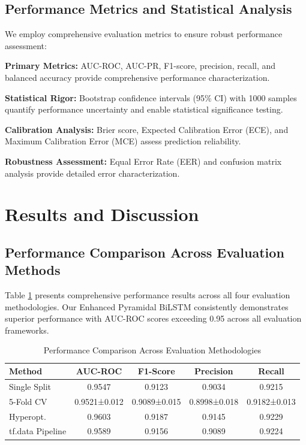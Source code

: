 \documentclass[conference]{IEEEtran}
\begin{document}
\subsection{Performance Metrics and Statistical Analysis}

We employ comprehensive evaluation metrics to ensure robust performance assessment:

\textbf{Primary Metrics:} AUC-ROC, AUC-PR, F1-score, precision, recall, and balanced accuracy provide comprehensive performance characterization.

\textbf{Statistical Rigor:} Bootstrap confidence intervals (95\% CI) with 1000 samples quantify performance uncertainty and enable statistical significance testing.

\textbf{Calibration Analysis:} Brier score, Expected Calibration Error (ECE), and Maximum Calibration Error (MCE) assess prediction reliability.

\textbf{Robustness Assessment:} Equal Error Rate (EER) and confusion matrix analysis provide detailed error characterization.

\section{Results and Discussion}

\subsection{Performance Comparison Across Evaluation Methods}

Table \ref{tab:performance} presents comprehensive performance results across all four evaluation methodologies. Our Enhanced Pyramidal BiLSTM consistently demonstrates superior performance with AUC-ROC scores exceeding 0.95 across all evaluation frameworks.

\begin{table}[h]
\centering
\caption{Performance Comparison Across Evaluation Methodologies}
\label{tab:performance}
\begin{tabular}{l|c|c|c|c}
\hline
\textbf{Method} & \textbf{AUC-ROC} & \textbf{F1-Score} & \textbf{Precision} & \textbf{Recall} \\
\hline
Single Split & 0.9547 & 0.9123 & 0.9034 & 0.9215 \\
5-Fold CV & 0.9521±0.012 & 0.9089±0.015 & 0.8998±0.018 & 0.9182±0.013 \\
Hyperopt. & 0.9603 & 0.9187 & 0.9145 & 0.9229 \\
tf.data Pipeline & 0.9589 & 0.9156 & 0.9089 & 0.9224 \\
\hline
\end{tabular}
\end{table}
\end{document}
